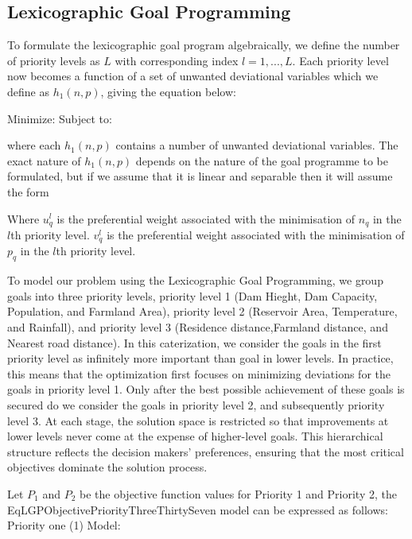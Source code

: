 \subsection{Lexicographic Goal Programming}

To formulate the lexicographic goal program algebraically, we define the number of priority levels as $L$ with corresponding index $l = 1, ..., L.$ Each priority level now becomes a function of a set of unwanted deviational variables which we define as $h_1(n, p)$, giving the equation below:

Minimize:
            \EqLObjectiveThirtyThree
Subject to:
            \EqGGPMinFunctionSubTwo
            \EqCGPConstraintEight
            \EqGGPMinFunctionSubFour   

where each $h_1(n,p)$ contains a number of unwanted deviational variables. The exact nature of $h_1(n,p)$ depends on the nature of the goal programme to be formulated, but if we assume that it is linear and separable then it will assume the form 

            \EqLObjectiveThirtyFour

Where $u_q^l$ is the preferential weight associated with the minimisation of $n_q$ in the $l$th priority level. $v_q^l$ is the preferential weight associated with the minimisation of $p_q$ in the $l$th priority level. 

To model our problem using the Lexicographic Goal Programming, we group goals into three priority levels, priority level 1 (Dam Hieght, Dam Capacity, Population, and Farmland Area), priority level 2 (Reservoir Area, Temperature, and Rainfall), and priority level 3 (Residence distance,Farmland distance, and Nearest road distance). In this caterization, we consider the goals in the first priority level as infinitely more important than goal in lower levels.
In practice, this means that the optimization first focuses on minimizing deviations for the goals in priority level 1. Only after the best possible achievement of these goals is secured do we consider the goals in priority level 2, and subsequently priority level 3. At each stage, the solution space is restricted so that improvements at lower levels never come at the expense of higher-level goals. This hierarchical structure reflects the decision makers’ preferences, ensuring that the most critical objectives dominate the solution process.

Let $P_1$ and $P_2$ be the objective function values for Priority 1 and Priority 2, the EqLGPObjectivePriorityThreeThirtySeven model can be expressed as follows:
Priority one (1) Model:

